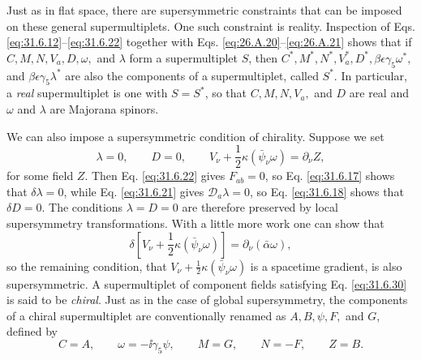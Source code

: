 Just as in flat space, there are supersymmetric constraints that can be
imposed on these general supermultiplets. One such constraint is
reality. Inspection of Eqs. \eqref{eq:31.6.12}--\eqref{eq:31.6.22}
together with Eqs. \eqref{eq:26.A.20}--\eqref{eq:26.A.21} shows that if
\(C,M,N,V_a,D,\omega,\) and \(\lambda\) form a supermultiplet \(S\),
then \(C^*,M^*,N^*,V_a^*,D^*,\beta\epsilon\gamma_5\omega^*,\) and
\(\beta\epsilon\gamma_5\lambda^*\) are also the components of a
supermultiplet, called \(S^*\). In particular, a \emph{real}
supermultiplet is one with \(S=S^*\), so that \(C,M,N,V_a,\) and \(D\)
are real and \(\omega\) and \(\lambda\) are Majorana spinors.

We can also impose a supersymmetric condition of chirality. Suppose we
set
\begin{equation}
  \lambda=0,\qquad D=0,\qquad
  V_\nu+\frac{1}{2}\kappa(\bar\psi_\nu\omega)=\partial_\nu Z,
  \tag{31.6.30}\label{eq:31.6.30}
\end{equation}
for some field \(Z\). Then Eq. \eqref{eq:31.6.22} gives \(F_{ab}=0\), so
Eq. \eqref{eq:31.6.17} shows that \(\delta\lambda=0\), while
Eq. \eqref{eq:31.6.21} gives \(\mathcal D_a\lambda=0\), so
Eq. \eqref{eq:31.6.18} shows that \(\delta D=0\). The conditions
\(\lambda=D=0\) are therefore preserved by local supersymmetry
transformations. With a little more work one can show that
\begin{equation}
  \delta\left[
    V_\nu+\frac{1}{2}\kappa(\bar\psi_\nu\omega)\right]
  =\partial_\nu(\bar\alpha\omega),
  \tag{31.6.31}\label{eq:31.6.31}
\end{equation}
so the remaining condition, that
\(V_\nu+\frac{1}{2}\kappa(\bar\psi_\nu\omega)\) is a spacetime gradient,
is also supersymmetric. A supermultiplet of component fields satisfying
Eq. \eqref{eq:31.6.30} is said to be \emph{chiral}. Just as in the case
of global supersymmetry, the components of a chiral supermultiplet are
conventionally renamed as \(A,B,\psi,F,\) and \(G\), defined by
\begin{equation}
  C=A,\qquad
  \omega=-\ii\gamma_5\psi,\qquad
  M=G,\qquad
  N=-F,\qquad
  Z=B.
  \tag{31.6.32}\label{eq:31.6.32}
\end{equation}

